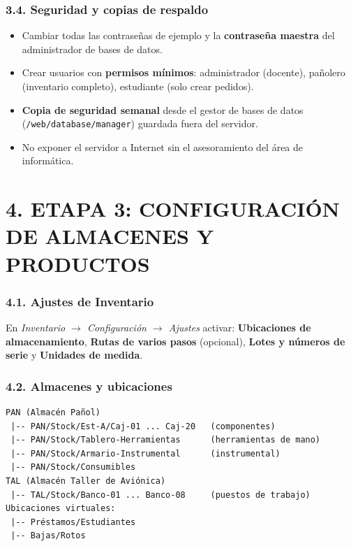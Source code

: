 \subsubsection*{3.4. Seguridad y copias de respaldo}
\begin{itemize}
  \item Cambiar todas las contraseñas de ejemplo y la \textbf{contraseña maestra} del
        administrador de bases de datos.
  \item Crear usuarios con \textbf{permisos mínimos}: administrador (docente), pañolero
        (inventario completo), estudiante (solo crear pedidos).
  \item \textbf{Copia de seguridad semanal} desde el gestor de bases de datos
        (\texttt{/web/database/manager}) guardada fuera del servidor.
  \item No exponer el servidor a Internet sin el asesoramiento del área de informática.
\end{itemize}

\section*{4. ETAPA 3: CONFIGURACIÓN DE ALMACENES Y PRODUCTOS}

\subsubsection*{4.1. Ajustes de Inventario}
En \textit{Inventario $\rightarrow$ Configuración $\rightarrow$ Ajustes} activar:
\textbf{Ubicaciones de almacenamiento}, \textbf{Rutas de varios pasos} (opcional),
\textbf{Lotes y números de serie} y \textbf{Unidades de medida}.

\subsubsection*{4.2. Almacenes y ubicaciones}
\begin{verbatim}
PAN (Almacén Pañol)
 |-- PAN/Stock/Est-A/Caj-01 ... Caj-20   (componentes)
 |-- PAN/Stock/Tablero-Herramientas      (herramientas de mano)
 |-- PAN/Stock/Armario-Instrumental      (instrumental)
 |-- PAN/Stock/Consumibles
TAL (Almacén Taller de Aviónica)
 |-- TAL/Stock/Banco-01 ... Banco-08     (puestos de trabajo)
Ubicaciones virtuales:
 |-- Préstamos/Estudiantes
 |-- Bajas/Rotos
\end{verbatim}

